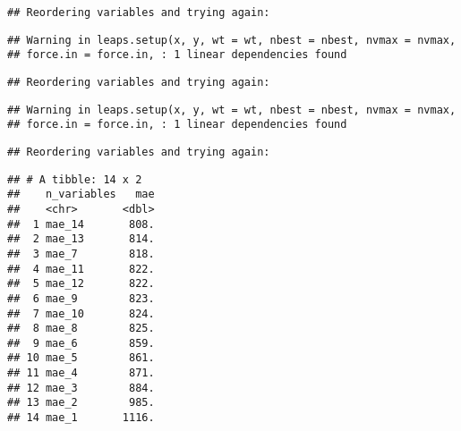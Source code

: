 \documentclass[]{article}
\newenvironment{Shaded}{\begin{snugshade}}{\end{snugshade}}
\newcommand{\DataTypeTok}[1]{\textcolor[rgb]{0.13,0.29,0.53}{#1}}
\newcommand{\DecValTok}[1]{\textcolor[rgb]{0.00,0.00,0.81}{#1}}
\newcommand{\KeywordTok}[1]{\textcolor[rgb]{0.13,0.29,0.53}{\textbf{#1}}}
\newcommand{\NormalTok}[1]{#1}
\newcommand{\OperatorTok}[1]{\textcolor[rgb]{0.81,0.36,0.00}{\textbf{#1}}}
\newcommand{\StringTok}[1]{\textcolor[rgb]{0.31,0.60,0.02}{#1}}
\begin{document}
\begin{verbatim}
## Reordering variables and trying again:
\end{verbatim}

\begin{verbatim}
## Warning in leaps.setup(x, y, wt = wt, nbest = nbest, nvmax = nvmax,
## force.in = force.in, : 1 linear dependencies found
\end{verbatim}

\begin{verbatim}
## Reordering variables and trying again:
\end{verbatim}

\begin{verbatim}
## Warning in leaps.setup(x, y, wt = wt, nbest = nbest, nvmax = nvmax,
## force.in = force.in, : 1 linear dependencies found
\end{verbatim}

\begin{verbatim}
## Reordering variables and trying again:
\end{verbatim}

\begin{Shaded}
\end{Shaded}

\begin{verbatim}
## # A tibble: 14 x 2
##    n_variables   mae
##    <chr>       <dbl>
##  1 mae_14       808.
##  2 mae_13       814.
##  3 mae_7        818.
##  4 mae_11       822.
##  5 mae_12       822.
##  6 mae_9        823.
##  7 mae_10       824.
##  8 mae_8        825.
##  9 mae_6        859.
## 10 mae_5        861.
## 11 mae_4        871.
## 12 mae_3        884.
## 13 mae_2        985.
## 14 mae_1       1116.
\end{verbatim}

\begin{Shaded}
\end{Shaded}
\end{document}
